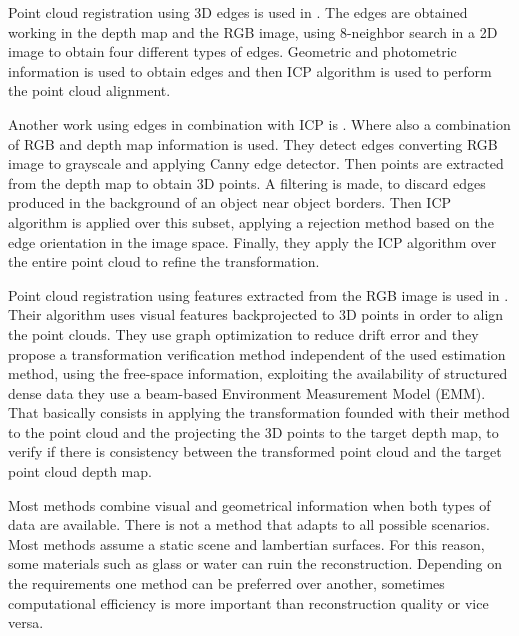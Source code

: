 Point cloud registration using 3D edges is used in \cite{choi13}. The edges are obtained working in the depth map and the RGB image, 
using 8-neighbor search in a 2D image to obtain four different types of edges. Geometric and photometric information is used to 
obtain edges and then ICP algorithm is used to perform the point cloud alignment.  


Another work using edges in combination with ICP is \cite{dryan2012}. Where also a combination of RGB and depth map information is 
used. They detect edges converting RGB image to grayscale and applying Canny edge detector. Then points are extracted from 
the depth map to obtain 3D points. A filtering is made, to discard edges produced in the background of an object near object borders. 
Then ICP algorithm is applied over this subset, applying a rejection method based on the edge orientation in the image space. Finally, 
they apply the ICP algorithm over the entire point cloud to refine the transformation.

Point cloud registration using features extracted from the RGB image is used in \cite{endres13}. Their algorithm uses visual features 
backprojected to 3D points in order to align the point clouds. They use graph optimization to reduce drift error and they propose a 
transformation verification method independent of the used estimation method, using the free-space information,
exploiting the availability of structured dense data they use a beam-based Environment Measurement Model (EMM). That basically consists 
in applying the transformation founded with their method to the point cloud and the projecting the 3D points to the target depth map, 
to verify if there is consistency 
between the transformed point cloud and the target point cloud depth map.


Most methods combine visual and geometrical information when both types of data are available. There is not a method 
that adapts to all possible scenarios. Most methods assume a static scene and lambertian 
surfaces. For this reason, some materials such as glass or water can ruin the reconstruction. 
Depending on the requirements one method can be preferred 
over another, sometimes computational efficiency is more important than reconstruction quality or vice versa.










